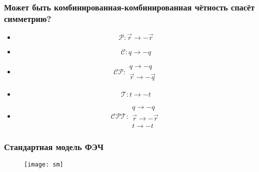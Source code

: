 \begin{frame}
    \frametitle{Может быть комбинированная-комбинированная чётность спасёт симметрию?}
    \begin{itemize}[<+->]
        \item
            \begin{equation*}
                \mathcal{P}: \vec{r} \to - \vec{r}
            \end{equation*}
        \item
            \begin{equation*}
                \mathcal{C}: q \to - q
            \end{equation*}
        \item
            \begin{equation*}
                \mathcal{CP}:
                \begin{array}{c}
                    q \to - q \\
                    \vec{r} \to - \vec{q}
                \end{array}
            \end{equation*}
        \item
            \begin{equation*}
                \mathcal{T}: t \to - t
            \end{equation*}
        \item
            \begin{equation*}
                \mathcal{CPT}:
                \begin{array}{c}
                    q \to - q \\
                    \vec{r} \to - \vec{r} \\
                    t \to - t
                \end{array}
            \end{equation*}
    \end{itemize}
\end{frame}

\begin{frame}
    \frametitle{Стандартная модель ФЭЧ}
    \begin{figure}
        \begin{centering}
            \texttt{[image: sm]}
        \end{centering}
    \end{figure}
\end{frame}
